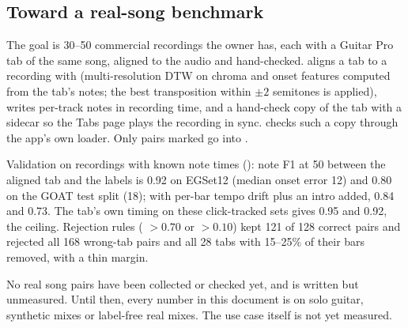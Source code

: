 \subsection{Toward a real-song benchmark}
\label{sec:bench-real}

The goal is 30--50 commercial recordings the owner has, each with a Guitar Pro
tab of the same song, aligned to the audio and hand-checked.
 \done{} aligns a tab to a recording with
 (multi-resolution DTW on chroma and onset features computed
from the tab's notes; the best transposition within $\pm2$ semitones is
applied), writes per-track notes in recording time, and a hand-check copy of the
tab with a sidecar so the Tabs page plays the recording in sync.
 checks such a copy through the
app's own loader. Only pairs marked  go into .

Validation on recordings with known note times \measured{}
(): note F1 at 50\ms{} between the aligned tab and
the labels is 0.92 on EGSet12 (median onset error 12\ms) and 0.80 on the GOAT
test split (18\ms); with per-bar tempo drift plus an intro added, 0.84 and 0.73.
The tab's own timing on these click-tracked sets gives 0.95 and 0.92, the
ceiling. Rejection rules ( $>0.70$ or  $>0.10$)
kept 121 of 128 correct pairs and rejected all 168 wrong-tab pairs and all 28
tabs with 15--25\% of their bars removed, with a thin margin.

\begin{caution}[: status]
No real song pairs have been collected or checked yet, and  is
written but unmeasured. Until then, every number in this document is on solo
guitar, synthetic mixes or label-free real mixes. The use case itself is not
yet measured.
\end{caution}

